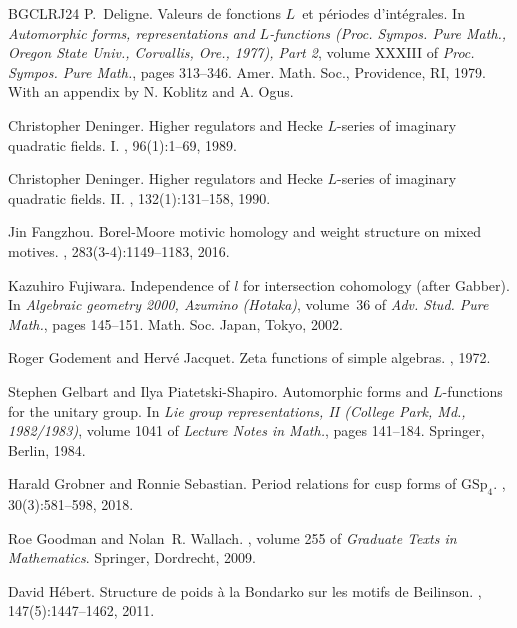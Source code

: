 \documentclass[11pt, a4paper]{amsart}
\theoremstyle{plain}
\theoremstyle{definition}
\numberwithin{equation}{section}
\begin{document}
\begin{thebibliography}{BGCLRJ24}
P.~Deligne.
\newblock Valeurs de fonctions {$L$}\ et p\'eriodes d'int\'egrales.
\newblock In {\em Automorphic forms, representations and {$L$}-functions
  ({P}roc. {S}ympos. {P}ure {M}ath., {O}regon {S}tate {U}niv., {C}orvallis,
  {O}re., 1977), {P}art 2}, volume XXXIII of {\em Proc. Sympos. Pure Math.},
  pages 313--346. Amer. Math. Soc., Providence, RI, 1979.
\newblock With an appendix by N. Koblitz and A. Ogus.

Christopher Deninger.
\newblock Higher regulators and {H}ecke {$L$}-series of imaginary quadratic
  fields. {I}.
, 96(1):1--69, 1989.

Christopher Deninger.
\newblock Higher regulators and {H}ecke {$L$}-series of imaginary quadratic
  fields. {II}.
, 132(1):131--158, 1990.

Jin Fangzhou.
\newblock Borel-{M}oore motivic homology and weight structure on mixed motives.
, 283(3-4):1149--1183, 2016.

Kazuhiro Fujiwara.
\newblock Independence of {$l$} for intersection cohomology (after {G}abber).
\newblock In {\em Algebraic geometry 2000, {A}zumino ({H}otaka)}, volume~36 of
  {\em Adv. Stud. Pure Math.}, pages 145--151. Math. Soc. Japan, Tokyo, 2002.

Roger Godement and Herv{\'e} Jacquet.
\newblock Zeta functions of simple algebras.
, 1972.

Stephen Gelbart and Ilya Piatetski-Shapiro.
\newblock Automorphic forms and {$L$}-functions for the unitary group.
\newblock In {\em Lie group representations, {II} ({C}ollege {P}ark, {M}d.,
  1982/1983)}, volume 1041 of {\em Lecture Notes in Math.}, pages 141--184.
  Springer, Berlin, 1984.

Harald Grobner and Ronnie Sebastian.
\newblock Period relations for cusp forms of {${\mathrm{GSp}}_4$}.
, 30(3):581--598, 2018.

Roe Goodman and Nolan~R. Wallach.
, volume 255 of {\em
  Graduate Texts in Mathematics}.
\newblock Springer, Dordrecht, 2009.

David H\'ebert.
\newblock Structure de poids \`a{} la {B}ondarko sur les motifs de {B}eilinson.
, 147(5):1447--1462, 2011.


\end{thebibliography}
\end{document}
